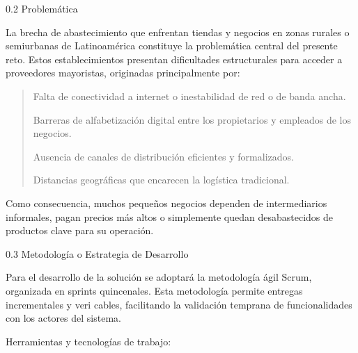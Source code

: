 \documentclass[
]{article}
\begin{document}
0.2 Problemática

La brecha de abastecimiento que enfrentan tiendas y negocios en zonas
rurales o semiurbanas de Latinoamérica constituye la problemática
central del presente reto. Estos establecimientos presentan dificultades
estructurales para acceder a proveedores mayoristas, originadas
principalmente por:

\begin{quote}
Falta de conectividad a internet o inestabilidad de red o de banda
ancha.

Barreras de alfabetización digital entre los propietarios y empleados de
los negocios.

Ausencia de canales de distribución eficientes y formalizados.

Distancias geográficas que encarecen la logística tradicional.
\end{quote}

Como consecuencia, muchos pequeños negocios dependen de intermediarios
informales, pagan precios más altos o simplemente quedan desabastecidos
de productos clave para su operación.

0.3 Metodología o Estrategia de Desarrollo

Para el desarrollo de la solución se adoptará la metodología ágil Scrum,
organizada en sprints quincenales. Esta metodología permite entregas
incrementales y veri cables, facilitando la validación temprana de
funcionalidades con los actores del sistema.

Herramientas y tecnologías de trabajo:
\end{document}
